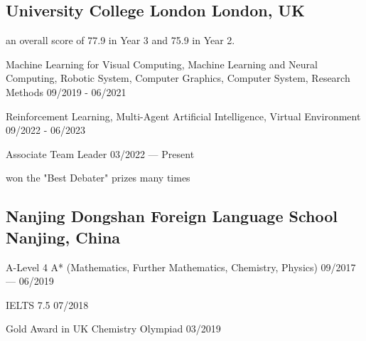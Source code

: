 
\subsection{
    University College London 
    \hfill London, UK
}
    \begin{zitemize}
        \item   an overall score of 77.9 in Year 3 and 75.9 in Year 2.  
        \item   Machine Learning for Visual Computing, 
                Machine Learning and Neural Computing, 
                Robotic System, 
                Computer Graphics, 
                Computer System,
                Research Methods 
                \hfill 09/2019 - 06/2021
        \item   Reinforcement Learning,    
                Multi-Agent Artificial Intelligence,
                Virtual Environment 
                \hfill 09/2022 - 06/2023
    \end{zitemize}

    \begin{zitemize}
        \item   Associate Team Leader 
                \hfill 03/2022 --- Present
        \item   won the "Best Debater" prizes many times
    \end{zitemize}


\vspace{0.3em}


\subsection{
    Nanjing Dongshan Foreign Language School 
    \hfill Nanjing, China
}
    \begin{zitemize}
        \item   A-Level 4 A* (Mathematics, Further Mathematics, Chemistry, Physics) 
                \hfill 09/2017 --- 06/2019 
        \item   IELTS 7.5 
                \hfill 07/2018 
        \item   Gold Award in UK Chemistry Olympiad
                \hfill 03/2019
    \end{zitemize}


